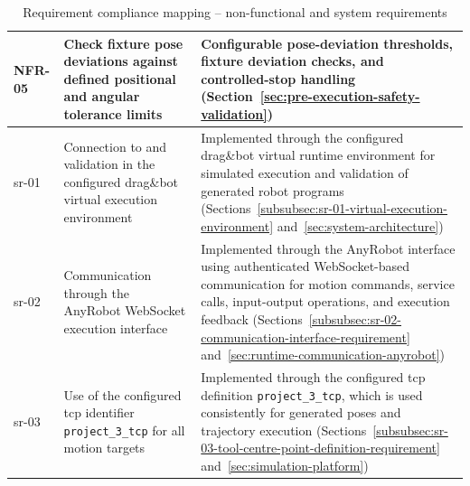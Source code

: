 \begin{landscape}
\begin{table}[p]
\begin{tabular}{
L{3.0cm}
L{6.8cm}
L{12.2cm}
}
NFR-05 & Check fixture pose deviations against defined positional and angular tolerance limits &
Configurable pose-deviation thresholds, fixture deviation checks, and controlled-stop handling (Section~\ref{sec:pre-execution-safety-validation}) \\
\hline

\acs{sr}-01 & Connection to and validation in the configured drag\&bot virtual execution environment &
Implemented through the configured drag\&bot virtual runtime environment for simulated execution and validation of generated robot programs (Sections~\ref{subsubsec:sr-01-virtual-execution-environment} and~\ref{sec:system-architecture}) \\
\hline

\acs{sr}-02 & Communication through the AnyRobot WebSocket execution interface &
Implemented through the AnyRobot interface using authenticated WebSocket-based communication for motion commands, service calls, input-output operations, and execution feedback (Sections~\ref{subsubsec:sr-02-communication-interface-requirement} and~\ref{sec:runtime-communication-anyrobot}) \\
\hline

\acs{sr}-03 & Use of the configured \ac{tcp} identifier \texttt{project\_3\_tcp} for all motion targets &
Implemented through the configured \ac{tcp} definition \texttt{project\_3\_tcp}, which is used consistently for generated poses and trajectory execution (Sections~\ref{subsubsec:sr-03-tool-centre-point-definition-requirement} and~\ref{sec:simulation-platform}) \\

\hline
\end{tabular}

\caption{Requirement compliance mapping -- non-functional and system requirements}
\label{tab:req-compliance-nfr-sr}

\end{table}

\end{landscape}
